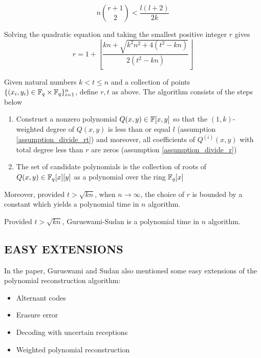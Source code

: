 \documentclass{article}
\begin{document}
$$
    n {r+1 \choose 2} < \frac{l(l+2)}{2k}
$$

Solving the quadratic equation and taking the smallest positive integer $r$ gives
$$
    r = 1 + \left\lfloor \frac{kn + \sqrt{k^2 n^2 + 4(t^2 - kn)}}{2(t^2 - kn)} \right\rfloor
$$

\begin{definition}
    Given natural numbers $k < t \leq n$ and a collection of points $\{(x_i, y_i) \in \mathbb{F}_q \times \mathbb{F}_q\}_{i = 1}^n$, define $r, t$ as above. The algorithm consists of the steps below
    \begin{enumerate}
        \item Construct a nonzero polynomial $Q(x, y) \in \mathbb{F}[x, y]$ so that the $(1, k)$-weighted degree of $Q(x, y)$ is less than or equal  $l$ (assumption \ref{assumption_divide_rt}) and moreover, all coefficients of $Q^{(i)}(x, y)$ with total degree less than $r$ are zeros (assumption \ref{assumption_divide_r})
        
        \item The set of candidate polynomials is the collection of roots of $Q(x, y) \in \mathbb{F}_q[x][y]$ as a polynomial over the ring $\mathbb{F}_q[x]$
    \end{enumerate}
\end{definition}

Moreover, provided $t > \sqrt{kn}$, when $n \to \infty$, the choice of $r$ is bounded by a constant which yields a polynomial time in $n$ algorithm.

\begin{theorem}
    Provided $t > \sqrt{kn}$, Guruswami-Sudan is a polynomial time in $n$ algorithm.
\end{theorem}

\subsection{EASY EXTENSIONS}

In the paper, Guruswami and Sudan also mentioned some easy extensions of the polynomial reconstruction algorithm: 
\begin{itemize}
    \item Alternant codes
    \item Erasure error
    \item Decoding with uncertain receptions
    \item Weighted polynomial reconstruction
\end{itemize}
\end{document}
